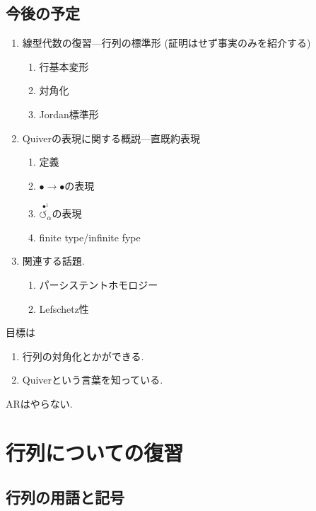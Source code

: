 \section*{今後の予定}
\begin{enumerate}
\item 線型代数の復習---行列の標準形 (証明はせず事実のみを紹介する)
  \begin{enumerate}
  \item 行基本変形
  \item 対角化
  \item Jordan標準形
  \end{enumerate}
\item Quiverの表現に関する概説---直既約表現
  \begin{enumerate}
  \item 定義
  \item $\bullet \to \bullet$の表現
  \item $\stackrel{\bullet^{1}}{\circlearrowleft_{\alpha}}$の表現
  \item finite type/infinite fype
  \end{enumerate}
\item
  関連する話題.
  \begin{enumerate}
  \item パーシステントホモロジー
  \item Lefschetz性
  \end{enumerate}
\end{enumerate}

目標は
\begin{enumerate}
\item 行列の対角化とかができる.
\item Quiverという言葉を知っている.
\end{enumerate}
ARはやらない.

\tableofcontents
\chapter{行列についての復習}
\section{行列の用語と記号}
  
